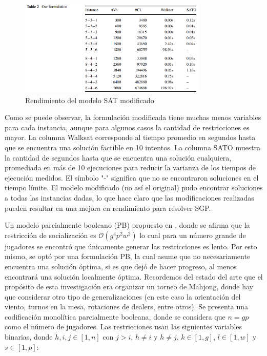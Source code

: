 \documentclass[letter, 10pt]{article}
\begin{document}
\begin{figure}[h]
    \centering
    \includegraphics[width=0.8\textwidth]{figures/triksaSAT.png}
    \caption{Rendimiento del modelo SAT modificado}
    \label{fig:sat_triska}
\end{figure}

Como se puede observar, la formulación modificada tiene muchas menos variables para cada instancia, aunque para algunos casos la cantidad de restricciones es mayor. La columna Walksat corresponde al tiempo promedio en segundos hasta que se encuentra una solución factible en 10 intentos. La columna SATO muestra la cantidad de segundos hasta que se encuentra una solución cualquiera, promediada en más de 10 ejecuciones para reducir la varianza de los tiempos de ejecución medidos. El símbolo "-" significa que no se encontraron soluciones en el tiempo límite. El modelo modificado (no así el original) pudo encontrar soluciones a todas las instancias dadas, lo que hace claro que las modificaciones realizadas pueden resultar en una mejora en rendimiento para resolver SGP.

Un modelo parcialmente booleano (PB) propuesto en \cite{lester21pb}, donde se afirma que la restricción de socialización es $\mathcal{O}(g^4p^2w^2)$ lo cual para un número grande de jugadores se encontró que únicamente generar las restricciones es lento. Por esto mismo, se optó por una formulación PB, la cual asume que no necesariamente encuentra una solución óptima, si es que dejó de hacer progreso, al menos encontrará una solución localmente óptima. Recordemos del estado del arte que el propósito de esta investigación era organizar un torneo de Mahjong, donde hay que considerar otro tipo de generalizaciones (en este caso la orientación del viento, turnos en la mesa, rotaciones de dealers, entre otros). Se presenta una codificación monolítica parcialmente booleana, donde se considera que $n=gp$ como el número de jugadores. Las restricciones usan las siguientes variables binarias, donde $h,i,j \in [1,n]$ con $j>i$, $h\neq i$ y $h\neq j$, $k\in [1,g]$, $l\in [1,w]$ y $s \in [1,p]$:
\end{document}
